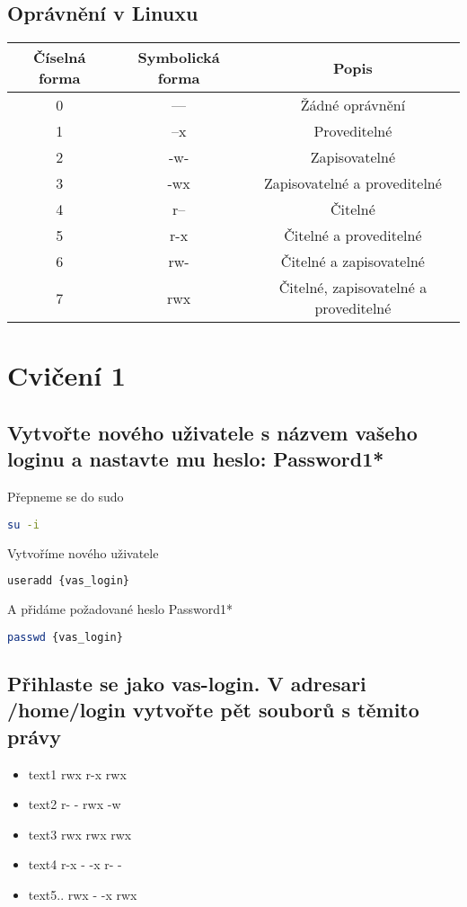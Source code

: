 \documentclass{article}
\begin{document}
\subsection{Oprávnění v Linuxu}

\begin{center}
\begin{tabular}{|c|c|c|}
\hline
\textbf{Číselná forma} & \textbf{Symbolická forma} & \textbf{Popis} \\
\hline
0 & --- & Žádné oprávnění \\
\hline
1 & --x & Proveditelné \\
\hline
2 & -w- & Zapisovatelné \\
\hline
3 & -wx & Zapisovatelné a proveditelné \\
\hline
4 & r-- & Čitelné \\
\hline
5 & r-x & Čitelné a proveditelné \\
\hline
6 & rw- & Čitelné a zapisovatelné \\
\hline
7 & rwx & Čitelné, zapisovatelné a proveditelné \\
\hline
\end{tabular}
\end{center}

\section{Cvičení 1}
\subsection{Vytvořte nového uživatele s názvem vašeho loginu a nastavte mu heslo: Password1*}
Přepneme se do sudo
\begin{lstlisting}[language=bash]
su -i
\end{lstlisting}
Vytvoříme nového uživatele
\begin{lstlisting}[language=bash]
useradd {vas_login}
\end{lstlisting}
A přidáme požadované heslo Password1*
\begin{lstlisting}[language=bash]
passwd {vas_login}
\end{lstlisting}

\subsection{Přihlaste se jako vas-login. V adresari /home/login vytvořte pět souborů s těmito právy}
\begin{itemize}
    \item text1 rwx r-x rwx
    \item text2 r- - rwx -w
    \item text3 rwx rwx rwx
    \item text4 r-x - -x r- -
    \item text5.. rwx - -x rwx
\end{itemize}
\end{document}
